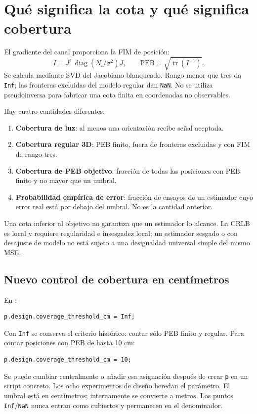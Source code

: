 \documentclass[11pt,a4paper]{article}
\begin{document}
\section{Qué significa la cota y qué significa cobertura}
El gradiente del canal proporciona la FIM de posición:
\begin{equation}
 I=J^{\mathsf T}\operatorname{diag}(N_i/\sigma^2)J,\qquad
 \mathrm{PEB}=\sqrt{\operatorname{tr}(I^{-1})}.
\end{equation}
Se calcula mediante SVD del Jacobiano blanqueado. Rango menor que tres da \texttt{Inf}; las fronteras excluidas del modelo regular dan \texttt{NaN}. No se utiliza pseudoinversa para fabricar una cota finita en coordenadas no observables.

Hay cuatro cantidades diferentes:
\begin{enumerate}
\item \textbf{Cobertura de luz}: al menos una orientación recibe señal aceptada.
\item \textbf{Cobertura regular 3D}: PEB finito, fuera de fronteras excluidas y con FIM de rango tres.
\item \textbf{Cobertura de PEB objetivo}: fracción de todas las posiciones con PEB finito y no mayor que un umbral.
\item \textbf{Probabilidad empírica de error}: fracción de ensayos de un estimador cuyo error real está por debajo del umbral. No es la cantidad anterior.
\end{enumerate}
Una cota inferior al objetivo no garantiza que un estimador lo alcance. La CRLB es local y requiere regularidad e insesgadez local; un estimador sesgado o con desajuste de modelo no está sujeto a una desigualdad universal simple del mismo MSE.

\subsection{Nuevo control de cobertura en centímetros}
En :
\begin{verbatim}
p.design.coverage_threshold_cm = Inf;
\end{verbatim}
Con \texttt{Inf} se conserva el criterio histórico: contar sólo PEB finito y regular. Para contar posiciones con PEB de hasta 10 cm:
\begin{verbatim}
p.design.coverage_threshold_cm = 10;
\end{verbatim}
Se puede cambiar centralmente o añadir esa asignación después de crear \texttt{p} en un script concreto. Los ocho experimentos de diseño heredan el parámetro. El umbral está en centímetros; internamente se convierte a metros. Los puntos \texttt{Inf}/\texttt{NaN} nunca entran como cubiertos y permanecen en el denominador.
\end{document}
